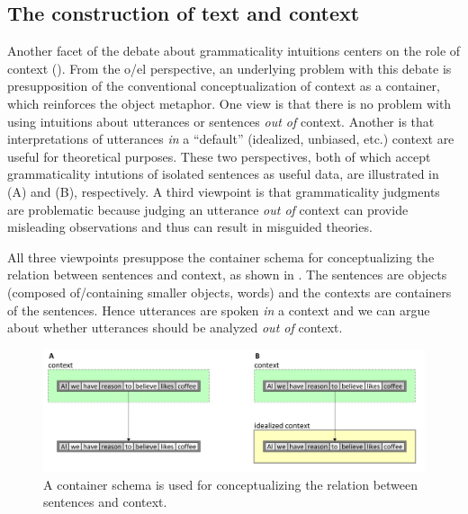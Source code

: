 \subsection{The construction of text and context}

Another facet of the debate about grammaticality intuitions centers on the role of context (\citealt{Bolinger1965,Keller2000,Schütze2016}). From the o/el perspective, an underlying problem with this debate is presupposition of the conventional conceptualization of context as a container, which reinforces the object metaphor. One view is that there is no problem with using intuitions about utterances or sentences \textit{out of} context. Another is that interpretations of utterances \textit{in} a “default” (idealized, unbiased, etc.) context are useful for theoretical purposes. These two perspectives, both of which accept grammaticality intutions of isolated sentences as useful data, are illustrated in {}(A) and (B), respectively. A third viewpoint is that grammaticality judgments are problematic because judging an utterance \textit{out of} context can provide misleading observations and thus can result in misguided theories.

  All three viewpoints presuppose the container schema for conceptualizing the relation between sentences and context, as shown in {}. The sentences are objects (composed of/containing smaller objects, words) and the contexts are containers of the sentences. Hence utterances are spoken \textit{in} a context and we can argue about whether utterances should be analyzed \textit{out of} context.   

  
\begin{figure}
\includegraphics[width=\textwidth]{figures/Tilsen-img120.png}
\caption{A container schema is used for conceptualizing the relation between sentences and context.}
\label{fig:6:1}
\end{figure}
 

